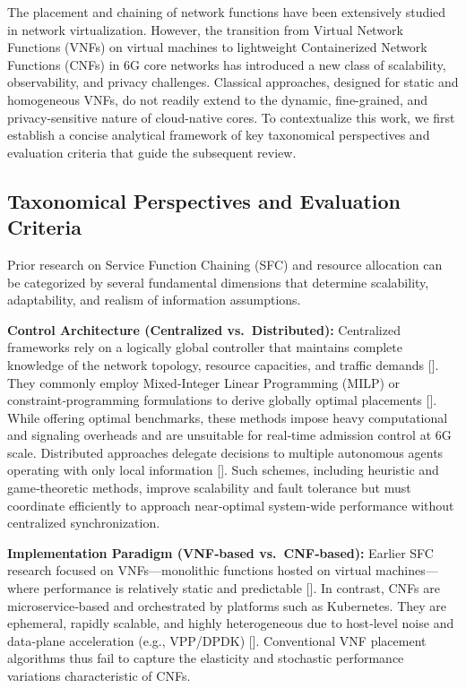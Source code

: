 \documentclass[journal]{IEEEtran}
\theoremstyle{plain}
\theoremstyle{definition}
\theoremstyle{remark}
\begin{document}
The placement and chaining of network functions have been extensively studied in network virtualization. However, the transition from Virtual Network Functions (VNFs) on virtual machines to lightweight Containerized Network Functions (CNFs) in 6G core networks has introduced a new class of scalability, observability, and privacy challenges. Classical approaches, designed for static and homogeneous VNFs, do not readily extend to the dynamic, fine-grained, and privacy-sensitive nature of cloud-native cores. To contextualize this work, we first establish a concise analytical framework of key taxonomical perspectives and evaluation criteria that guide the subsequent review.

\subsection{Taxonomical Perspectives and Evaluation Criteria}

Prior research on Service Function Chaining (SFC) and resource allocation can be categorized by several fundamental dimensions that determine scalability, adaptability, and realism of information assumptions.

\textbf{Control Architecture (Centralized vs.\ Distributed):}
Centralized frameworks rely on a logically global controller that maintains complete knowledge of the network topology, resource capacities, and traffic demands []. They commonly employ Mixed‑Integer Linear Programming (MILP) or constraint‑programming formulations to derive globally optimal placements []. While offering optimal benchmarks, these methods impose heavy computational and signaling overheads and are unsuitable for real‑time admission control at 6G scale. Distributed approaches delegate decisions to multiple autonomous agents operating with only local information []. Such schemes, including heuristic and game‑theoretic methods, improve scalability and fault tolerance but must coordinate efficiently to approach near‑optimal system‑wide performance without centralized synchronization.

\textbf{Implementation Paradigm (VNF‑based vs.\ CNF‑based):}
Earlier SFC research focused on VNFs—monolithic functions hosted on virtual machines—where performance is relatively static and predictable []. In contrast, CNFs are microservice‑based and orchestrated by platforms such as Kubernetes. They are ephemeral, rapidly scalable, and highly heterogeneous due to host‑level noise and data‑plane acceleration (e.g., VPP/DPDK) []. Conventional VNF placement algorithms thus fail to capture the elasticity and stochastic performance variations characteristic of CNFs.
\end{document}
